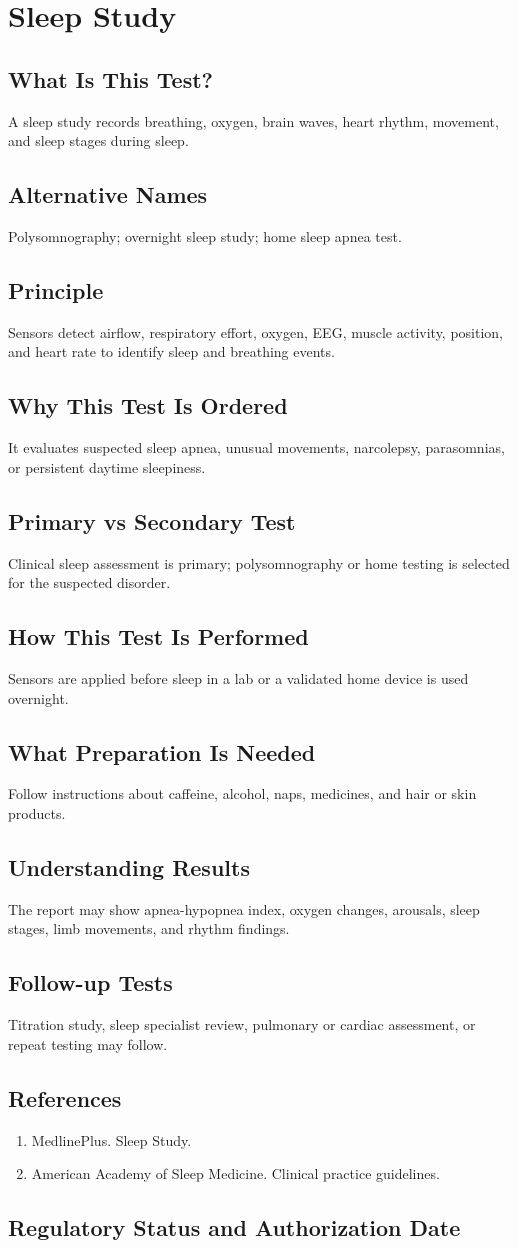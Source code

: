 \chapter{Sleep Study}
\section*{What Is This Test?} A sleep study records breathing, oxygen, brain waves, heart rhythm, movement, and sleep stages during sleep.\section*{Alternative Names} Polysomnography; overnight sleep study; home sleep apnea test.\section*{Principle} Sensors detect airflow, respiratory effort, oxygen, EEG, muscle activity, position, and heart rate to identify sleep and breathing events.\section*{Why This Test Is Ordered} It evaluates suspected sleep apnea, unusual movements, narcolepsy, parasomnias, or persistent daytime sleepiness.\section*{Primary vs Secondary Test} Clinical sleep assessment is primary; polysomnography or home testing is selected for the suspected disorder.\section*{How This Test Is Performed} Sensors are applied before sleep in a lab or a validated home device is used overnight.\section*{What Preparation Is Needed} Follow instructions about caffeine, alcohol, naps, medicines, and hair or skin products.\section*{Understanding Results} The report may show apnea-hypopnea index, oxygen changes, arousals, sleep stages, limb movements, and rhythm findings.\section*{Follow-up Tests} Titration study, sleep specialist review, pulmonary or cardiac assessment, or repeat testing may follow.\section*{References} \begin{enumerate}\item MedlinePlus. Sleep Study.\item American Academy of Sleep Medicine. Clinical practice guidelines.\end{enumerate}\clearpage\section*{Regulatory Status and Authorization Date}\clearpage
